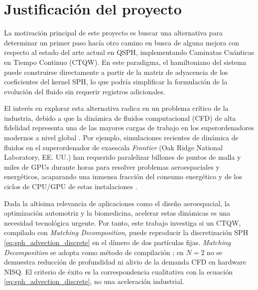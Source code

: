 \section{Justificación del proyecto}

La motivación principal de este proyecto es buscar una alternativa para determinar un primer paso hacía otro camino en busca de alguna mejora con respecto al estado del arte actual en QSPH, implementando Caminatas Cuánticas en Tiempo Continuo (CTQW). En este paradigma, el hamiltoniano del sistema puede construirse directamente a partir de la matriz de adyacencia de los coeficientes del kernel SPH, lo que podría simplificar la formulación de la evolución del fluido sin requerir registros adicionales.

El interés en explorar esta alternativa radica en un problema crítico de la industria, debido a que la dinámica de fluidos computacional (CFD) de alta fidelidad representa una de las mayores cargas de trabajo en los superordenadores modernos a nivel global \cite{Karp2024CFDMSA}. Por ejemplo, simulaciones recientes de dinámica de fluidos en el superordenador de exaescala \textit{Frontier} (Oak Ridge National Laboratory, EE. UU.) han requerido paralelizar billones de puntos de malla y miles de GPUs durante horas para resolver problemas aeroespaciales y energéticos, acaparando una inmensa fracción del consumo energético y de los ciclos de CPU/GPU de estas instalaciones \cite{OakRidge2025FrontierCFD}.

Dada la altísima relevancia de aplicaciones como el diseño aeroespacial, la optimización automotriz y la biomedicina, acelerar estas dinámicas es una necesidad tecnológica urgente. Por tanto, este trabajo investiga si un CTQW, compilado con \emph{Matching Decomposition}, puede reproducir la discretización SPH \eqref{eq:sph_advection_discrete} en el dímero de dos partículas fijas. \emph{Matching Decomposition} se adopta como método de compilación \cite{matching2026}; en $N=2$ no se demuestra reducción de profundidad ni alivio de la demanda CFD en hardware NISQ. El criterio de éxito es la correspondencia cualitativa con la ecuación \eqref{eq:sph_advection_discrete}, no una aceleración industrial.
